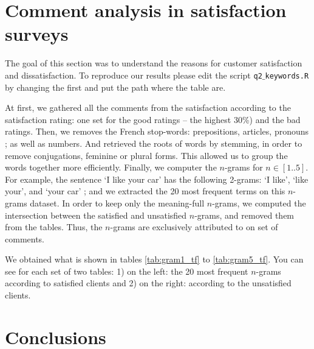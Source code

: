 \documentclass[a4paper, 11pt]{article}
\newcommand{\tw}[1]{\texttt{#1}}
\begin{document}
\section{Comment analysis in satisfaction surveys}
The goal of this section was to understand the reasons for customer satisfaction and dissatisfaction. To reproduce our results please edit the script \tw{q2$\_$keywords.R} by changing the first and put the path where the table are.

At first, we gathered all the comments from the satisfaction according to the satisfaction rating: one set for the good ratings -- the highest 30\%) and the bad ratings.
Then, we removes the French stop-words: prepositions, articles, pronouns ; as well as numbers. And retrieved the roots of words by stemming, in order to remove conjugations, feminine or plural forms. This allowed us to group the words together more efficiently.
Finally, we computer the $n$-grams for $n \in [1..5]$. For example, the sentence `I like your car' has the following 2-grams: `I like', `like your', and `your car' ;
and we extracted the 20 most frequent terms on this $n$-grams dataset.
In order to keep only the meaning-full $n$-grams, we computed the intersection between the satisfied and unsatisfied $n$-grams, and removed them from the tables. Thus, the $n$-grams are exclusively attributed to on set of comments.

We obtained what is shown in tables \ref{tab:gram1_tf} to \ref{tab:gram5_tf}. You can see for each set of two tables: 1) on the left: the 20 most frequent $n$-grams according to satisfied clients and 2) on the right: according to the unsatisfied clients.


        
        
\section{Conclusions}
\end{document}
